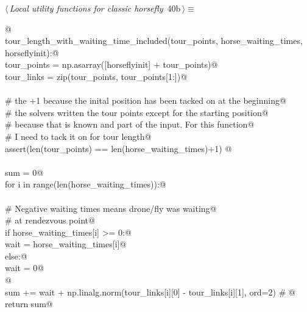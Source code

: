 \documentclass[11.5pt]{report}
\begin{document}
\begin{flushleft} \small\label{scrap40}\raggedright\small
{} $\langle\,${\itshape Local utility functions for classic horsefly}\nobreak\ {\footnotesize {40b}}$\,\rangle\equiv$
\vspace{-1ex}
\begin{list}{}{} \item
\mbox{}\verb@   @\\
\mbox{}\verb@def tour_length_with_waiting_time_included(tour_points, horse_waiting_times, horseflyinit):@\\
\mbox{}\verb@      tour_points   = np.asarray([horseflyinit] + tour_points)@\\
\mbox{}\verb@      tour_links    = zip(tour_points, tour_points[1:])@\\
\mbox{}\verb@@\\
\mbox{}\verb@      # the +1 because the inital position has been tacked on at the beginning@\\
\mbox{}\verb@      # the solvers written the tour points except for the starting position@\\
\mbox{}\verb@      # because that is known and part of the input. For this function@\\
\mbox{}\verb@      # I need to tack it on for tour length@\\
\mbox{}\verb@      assert(len(tour_points) == len(horse_waiting_times)+1) @\\
\mbox{}\verb@@\\
\mbox{}\verb@      sum = 0@\\
\mbox{}\verb@      for i in range(len(horse_waiting_times)):@\\
\mbox{}\verb@@\\
\mbox{}\verb@          # Negative waiting times means drone/fly was waiting@\\
\mbox{}\verb@          # at rendezvous point@\\
\mbox{}\verb@          if horse_waiting_times[i] >= 0:@\\
\mbox{}\verb@              wait = horse_waiting_times[i]@\\
\mbox{}\verb@          else:@\\
\mbox{}\verb@              wait = 0@\\
\mbox{}\verb@              @\\
\mbox{}\verb@          sum += wait + np.linalg.norm(tour_links[i][0] - tour_links[i][1], ord=2) # @\\
\mbox{}\verb@      return sum@\\

\end{list}
\end{flushleft}
\end{document}

